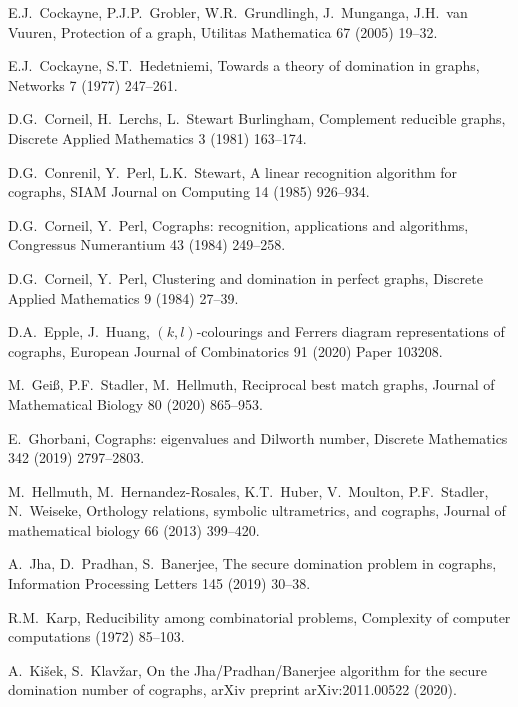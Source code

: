 \documentclass[12pt,a4paper,twoside]{article}
\theoremstyle{definition} %
\theoremstyle{plain} %
\numberwithin{equation}{section}  %
\begin{document}
\begin{thebibliography}{99}
    E.J.~Cockayne, P.J.P.~Grobler, W.R.~Grundlingh, J.~Munganga, J.H.~van Vuuren,
    Protection of a graph,
    Utilitas Mathematica 67 (2005) 19--32.
    
    E.J.~Cockayne, S.T.~Hedetniemi,
    Towards a theory of domination in graphs,
    Networks 7 (1977) 247--261.
    
    D.G.~Corneil, H.~Lerchs, L.~Stewart Burlingham,
    Complement reducible graphs,
    Discrete Applied Mathematics 3 (1981) 163--174.
    
    D.G.~Conrenil, Y.~Perl, L.K.~Stewart,
    A linear recognition algorithm for cographs,
    SIAM Journal on Computing 14 (1985) 926--934.
   
    D.G.~Corneil, Y.~Perl,
    Cographs: recognition, applications and algorithms,
    Congressus Numerantium 43 (1984) 249--258.
    
    D.G.~Corneil, Y.~Perl,
    Clustering and domination in perfect graphs,
    Discrete Applied Mathematics 9 (1984) 27--39.
    
    D.A.~Epple, J.~Huang,
    $(k, l)$-colourings and Ferrers diagram representations of cographs,
    European Journal of Combinatorics 91 (2020) Paper 103208.
    
    M.~Gei{\ss}, P.F.~Stadler, M.~Hellmuth,
    Reciprocal best match graphs,
    Journal of Mathematical Biology 80 (2020) 865--953.
    
    E.~Ghorbani,
    Cographs: eigenvalues and Dilworth number,
    Discrete Mathematics 342 (2019) 2797--2803.

    M.~Hellmuth, M.~Hernandez-Rosales, K.T.~Huber, V.~Moulton, P.F.~Stadler, N.~Weiseke,
    Orthology relations, symbolic ultrametrics, and cographs,
    Journal of mathematical biology 66 (2013) 399--420.

  A.~Jha, D.~Pradhan, S.~Banerjee, 
  The secure domination problem in cographs,
  Information Processing Letters 145 (2019) 30--38.
  
    R.M.~Karp,
    Reducibility among combinatorial problems,
    Complexity of computer computations (1972) 85--103.
    
    A.~Kišek, S.~Klavžar,
    On the Jha/Pradhan/Banerjee algorithm for the secure domination number of cographs,
    arXiv preprint arXiv:2011.00522 (2020).
    

\end{thebibliography}
\end{document}

